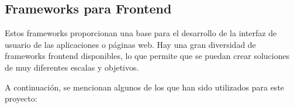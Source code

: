 \subsection{Frameworks para Frontend}
Estos frameworks proporcionan una base para el desarrollo de la interfaz de usuario de las aplicaciones o páginas web. Hay una gran diversidad de frameworks frontend disponibles, lo que permite que se puedan crear soluciones de muy diferentes escalas y objetivos.

A continuación, se mencionan algunos de los que han sido utilizados para este proyecto:
    
    